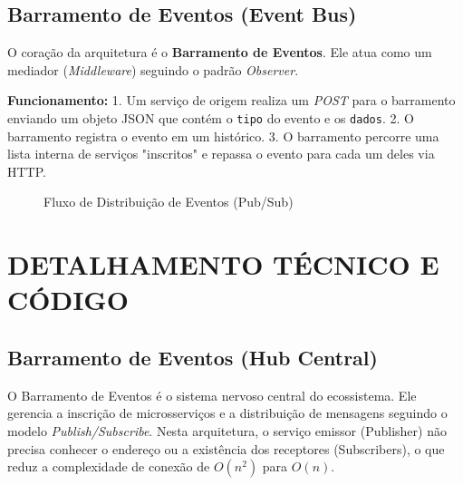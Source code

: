 \documentclass[12pt,a4paper]{article}
\begin{document}
\subsection{Barramento de Eventos (Event Bus)}
O coração da arquitetura é o \textbf{Barramento de Eventos}. Ele atua como um mediador (\textit{Middleware}) seguindo o padrão \textit{Observer}.

\textbf{Funcionamento:}
1. Um serviço de origem realiza um \textit{POST} para o barramento enviando um objeto JSON que contém o \texttt{tipo} do evento e os \texttt{dados}.
2. O barramento registra o evento em um histórico.
3. O barramento percorre uma lista interna de serviços "inscritos" e repassa o evento para cada um deles via HTTP.

\begin{figure}[h]
    \centering
    \caption{Fluxo de Distribuição de Eventos (Pub/Sub)}
\end{figure}

\newpage
\section{DETALHAMENTO TÉCNICO E CÓDIGO}

\subsection{Barramento de Eventos (Hub Central)}
O Barramento de Eventos é o sistema nervoso central do ecossistema. Ele gerencia a inscrição de microsserviços e a distribuição de mensagens seguindo o modelo \textit{Publish/Subscribe}. Nesta arquitetura, o serviço emissor (Publisher) não precisa conhecer o endereço ou a existência dos receptores (Subscribers), o que reduz a complexidade de conexão de $O(n^2)$ para $O(n)$.
\end{document}
